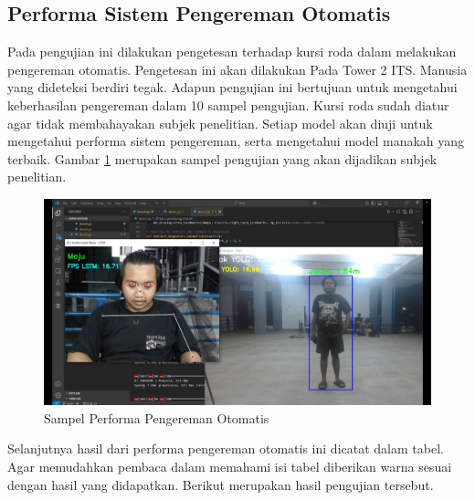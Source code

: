 \subsection{Performa Sistem Pengereman Otomatis}

Pada pengujian ini dilakukan pengetesan terhadap kursi roda dalam melakukan pengereman otomatis. Pengetesan ini akan dilakukan Pada Tower 2 ITS. Manusia yang dideteksi berdiri tegak. Adapun pengujian ini bertujuan untuk mengetahui keberhasilan pengereman dalam 10 sampel pengujian. Kursi roda sudah diatur agar tidak membahayakan subjek penelitian. Setiap model akan diuji untuk mengetahui performa sistem pengereman, serta mengetahui model manakah yang terbaik. Gambar \ref{fig:Fotoperforma} merupakan sampel pengujian yang akan dijadikan subjek penelitian.

\begin{figure} [H] \centering
  \includegraphics[scale=0.3]{gambar/performakeberhasilan.jpg}
  \caption{Sampel Performa Pengereman Otomatis}
  \label{fig:Fotoperforma}
\end{figure}

Selanjutnya hasil dari performa pengereman otomatis ini dicatat dalam tabel. Agar memudahkan pembaca dalam memahami isi tabel diberikan warna sesuai dengan hasil yang didapatkan. Berikut merupakan hasil pengujian tersebut.

